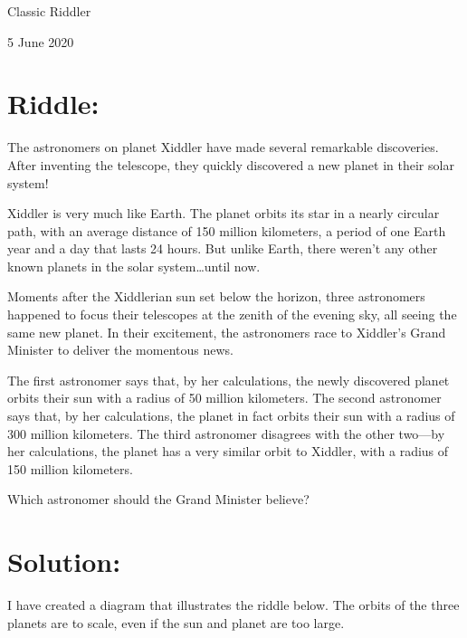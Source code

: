 \documentclass{article}
\begin{document}
\pagestyle{empty} %

\begin{center}
{\LARGE Classic Riddler}

\vspace{0.15in}

{\Large 5 June 2020}
\end{center}


\section*{Riddle:}

The astronomers on planet Xiddler have made several remarkable discoveries.
After inventing the telescope, they quickly discovered a new planet in their solar system!

Xiddler is very much like Earth.
The planet orbits its star in a nearly circular path, with an average distance of 150 million kilometers, a period of one Earth year and a day that lasts 24 hours.
But unlike Earth, there weren't any other known planets in the solar system\dots until now.

Moments after the Xiddlerian sun set below the horizon, three astronomers happened to focus their telescopes at the zenith of the evening sky, all seeing the same new planet.
In their excitement, the astronomers race to Xiddler's Grand Minister to deliver the momentous news.

The first astronomer says that, by her calculations, the newly discovered planet orbits their sun with a radius of 50 million kilometers.
The second astronomer says that, by her calculations, the planet in fact orbits their sun with a radius of 300 million kilometers.
The third astronomer disagrees with the other two---by her calculations, the planet has a very similar orbit to Xiddler, with a radius of 150 million kilometers.

Which astronomer should the Grand Minister believe?

\section*{Solution:}

I have created a diagram that illustrates the riddle below.
The orbits of the three planets are to scale, even if the sun and planet are too large.
\end{document}
